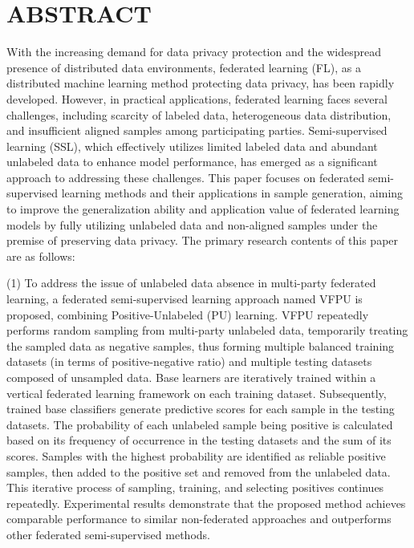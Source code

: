



\chapter{ABSTRACT}
\xiaosi

With the increasing demand for data privacy protection and the widespread presence of distributed data environments, federated learning (FL), as a distributed machine learning method protecting data privacy, has been rapidly developed. However, in practical applications, federated learning faces several challenges, including scarcity of labeled data, heterogeneous data distribution, and insufficient aligned samples among participating parties. Semi-supervised learning (SSL), which effectively utilizes limited labeled data and abundant unlabeled data to enhance model performance, has emerged as a significant approach to addressing these challenges. This paper focuses on federated semi-supervised learning methods and their applications in sample generation, aiming to improve the generalization ability and application value of federated learning models by fully utilizing unlabeled data and non-aligned samples under the premise of preserving data privacy. The primary research contents of this paper are as follows:

(1) To address the issue of unlabeled data absence in multi-party federated learning, a federated semi-supervised learning approach named VFPU is proposed, combining Positive-Unlabeled (PU) learning. VFPU repeatedly performs random sampling from multi-party unlabeled data, temporarily treating the sampled data as negative samples, thus forming multiple balanced training datasets (in terms of positive-negative ratio) and multiple testing datasets composed of unsampled data. Base learners are iteratively trained within a vertical federated learning framework on each training dataset. Subsequently, trained base classifiers generate predictive scores for each sample in the testing datasets. The probability of each unlabeled sample being positive is calculated based on its frequency of occurrence in the testing datasets and the sum of its scores. Samples with the highest probability are identified as reliable positive samples, then added to the positive set and removed from the unlabeled data. This iterative process of sampling, training, and selecting positives continues repeatedly. Experimental results demonstrate that the proposed method achieves comparable performance to similar non-federated approaches and outperforms other federated semi-supervised methods.

